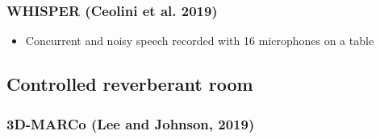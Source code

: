 \documentclass[14pt, legalpaper]{extarticle}
\begin{document}
\subsubsection{WHISPER (Ceolini et al. 2019)}

\begin{itemize}

\item Concurrent and noisy speech recorded with 16 microphones on a table \cite{ceolini2020evaluating}

\end{itemize}

\subsection{Controlled reverberant room}

\subsubsection{3D-MARCo (Lee and Johnson, 2019)}
\end{document}
